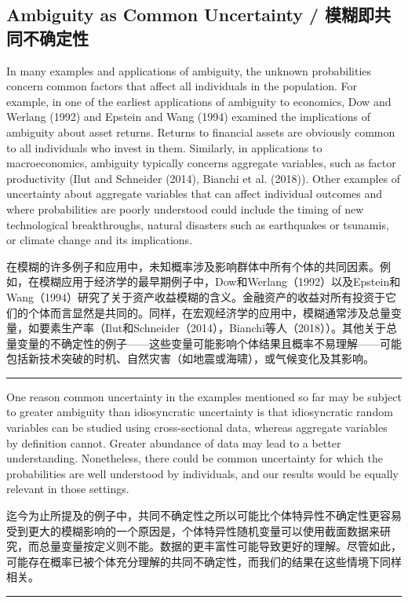 \documentclass[12pt,a4paper]{article}
\newenvironment{original}
  {\par\noindent\color{black}\smallskip}
  {\par\smallskip}
\newenvironment{translation}
  {\par\noindent\color{blue!70!black}\smallskip}
  {\par\medskip\hrule\medskip}
\begin{document}
\subsection{Ambiguity as Common Uncertainty / 模糊即共同不确定性}

\begin{original}
In many examples and applications of ambiguity, the unknown probabilities concern common factors that affect all individuals in the population. For example, in one of the earliest applications of ambiguity to economics, Dow and Werlang (1992) and Epstein and Wang (1994) examined the implications of ambiguity about asset returns. Returns to financial assets are obviously common to all individuals who invest in them. Similarly, in applications to macroeconomics, ambiguity typically concerns aggregate variables, such as factor productivity (Ilut and Schneider (2014), Bianchi et al. (2018)). Other examples of uncertainty about aggregate variables that can affect individual outcomes and where probabilities are poorly understood could include the timing of new technological breakthroughs, natural disasters such as earthquakes or tsunamis, or climate change and its implications.
\end{original}
\begin{translation}
在模糊的许多例子和应用中，未知概率涉及影响群体中所有个体的共同因素。例如，在模糊应用于经济学的最早期例子中，Dow和Werlang（1992）以及Epstein和Wang（1994）研究了关于资产收益模糊的含义。金融资产的收益对所有投资于它们的个体而言显然是共同的。同样，在宏观经济学的应用中，模糊通常涉及总量变量，如要素生产率（Ilut和Schneider（2014），Bianchi等人（2018））。其他关于总量变量的不确定性的例子——这些变量可能影响个体结果且概率不易理解——可能包括新技术突破的时机、自然灾害（如地震或海啸），或气候变化及其影响。
\end{translation}

\begin{original}
One reason common uncertainty in the examples mentioned so far may be subject to greater ambiguity than idiosyncratic uncertainty is that idiosyncratic random variables can be studied using cross-sectional data, whereas aggregate variables by definition cannot. Greater abundance of data may lead to a better understanding. Nonetheless, there could be common uncertainty for which the probabilities are well understood by individuals, and our results would be equally relevant in those settings.
\end{original}
\begin{translation}
迄今为止所提及的例子中，共同不确定性之所以可能比个体特异性不确定性更容易受到更大的模糊影响的一个原因是，个体特异性随机变量可以使用截面数据来研究，而总量变量按定义则不能。数据的更丰富性可能导致更好的理解。尽管如此，可能存在概率已被个体充分理解的共同不确定性，而我们的结果在这些情境下同样相关。
\end{translation}
\end{document}
